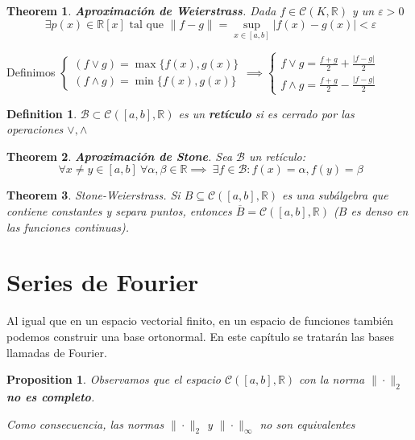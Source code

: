 \documentclass{myclass}
\newtheorem*{definition}{Definition}
\newtheorem*{theorem}{Theorem}
\newtheorem*{proposition}{Proposition}
\begin{document}
\begin{theorem}
\textbf{Aproximación de Weierstrass}. Dada $f\in \mathcal{C}(K, \mathbb{R})$ y un $\varepsilon >0$
\[
\ \exists  p(x) \in \mathbb{R}[x] \text{ tal que } \|f-g\|=\sup_{x\in [a, b]}|f(x)-g(x)|<\varepsilon 
\] 
\end{theorem}

Definimos $\begin{cases}
  (f\vee g) = \max\{f(x), g(x)\} \\
  (f\wedge g) = \min\{f(x), g(x)\} 
\end{cases}  \implies \begin{cases}
  f\vee g = \frac{f+g}{2}+\frac{|f-g|}{2} \\ 
  f\wedge g= \frac{f+g}{2}-\frac{|f-g|}{2}
\end{cases}$ 

\begin{definition}
$\mathcal{B}\subset \mathcal{C}([a, b], \mathbb{R})$ es un \textbf{retículo} si es cerrado por las operaciones $\vee, \wedge$
\end{definition}

\begin{theorem}
\textbf{Aproximación de Stone}. Sea $\mathcal{B}$ un retículo:
\[
\ \forall x\neq y \in [a,b] \ \forall \alpha , \beta \in \mathbb{R} \implies \ \exists f\in \mathcal{B} : f(x) = \alpha , f(y)=\beta 
\] 
\end{theorem}

\begin{theorem}
Stone-Weierstrass. Si $B\subseteq \mathcal{C}([a,b], \mathbb{R})$ es una subálgebra que contiene constantes y separa puntos, entonces $\overline{B} = \mathcal{C}([a,b], \mathbb{R})$ ($B$ es denso en las funciones continuas).
\end{theorem}


\section{Series de Fourier}
Al igual que en un espacio vectorial finito, en un espacio de funciones también podemos construir una base ortonormal. En este capítulo se tratarán las bases llamadas de Fourier.

\begin{proposition}
Observamos que el espacio $\mathcal{C}([a, b], \mathbb{R})$ con la norma $\|\cdot\|_{2}$ \textbf{no es completo}.

Como consecuencia, las normas $\|\cdot \|_2$ y $\|\cdot\|_\infty$ no son equivalentes
\end{proposition}
\end{document}
